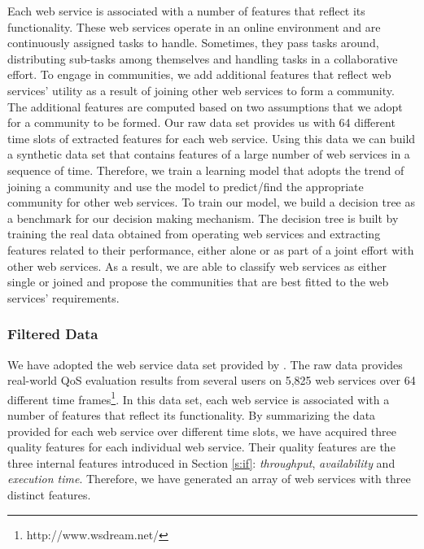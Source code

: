 Each web service is associated with a number of features that reflect its functionality. These web services operate in an online environment and are continuously assigned tasks to handle. Sometimes, they pass tasks around, distributing sub-tasks among themselves and handling tasks in a collaborative effort. To engage in communities, we add additional features that reflect web services' utility as a result of joining other web services to form a community. The additional features are computed based on two assumptions that we adopt for a community to be formed. Our raw data set provides us with 64 different time slots of extracted features for each web service. Using this data we can build a synthetic data set that contains features of a large number of web services in a sequence of time. Therefore, we train a learning model that adopts the trend of joining a community and use the model to predict/find the appropriate community for other web services. To train our model, we build a decision tree as a benchmark for our decision making mechanism. The decision tree is built by training the real data obtained from operating web services and extracting features related to their performance, either alone or as part of a joint effort with other web services. As a result, we are able to classify web services as either single or joined and propose the communities that are best fitted to the web services' requirements.

\subsubsection{Filtered Data}\label{sss:filtereddata}

We have adopted the web service data set provided by \cite{10.1109/ISSRE.2011.17}. The raw data provides real-world QoS evaluation results from several users on 5,825 web services over 64 different time frames\footnote{http://www.wsdream.net/}. In this data set, each web service is associated with a number of features that reflect its functionality. By summarizing the data provided for each web service over different time slots, we have acquired three quality features for each individual web service. Their quality features are the three internal features introduced in Section \ref{s:if}: \emph{throughput}, \emph{availability} and \emph{execution time}.
Therefore, we have generated an array of web services with three distinct features.

